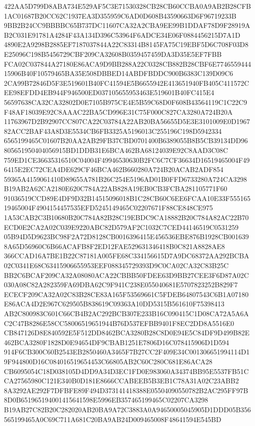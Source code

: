 \documentclass[UTF8,fontset=fandol,zihao=-4,a4paper]{ctexart}
\begin{document}
{{422AA5D799D8ABA734E529AF5C3E71530328CB28CB60CCBA0A9AB2B28CFB1AC01687B20CC62C1937EA3D355959C6AD0D608B43590663D6F96719233B
9BB2B24CC9BBBBC65B737DC11607CA32A2CBA9EE99B1DDAF78D9F28919AB2C031E91781A4284F43A134D396C53964F6ADCE34E06F0884456215D7A1D
4890E2A9298B2885EF7187037844A22C83314B8145FA75C19EBF5D6C708F03D8E25096C198B5456729CBF209CA32608B0359457459DA3D35E5EF7FBB
FCA02C037844A27180E86ACA9D9BB288A22C0328CB882B28CBF6E774655944415906B40F10579465BA35E508DBBED14ABDFBDDC900B6383C139D09C6
2CA99B72846D5F3E519601B40FC41594E5B6655942E413651940FB405C411572CEE98EFDD4EB944F946500ED037105655953463E519601B40FC415E4
56597638CA32CA32802D0E7105B975CE4E5B59C68D0F608B43564119C1C22C9F48AF18039E92C8AAAC22BA5CD996E31C75F000C827CA3280A724B20A
11763967D2B92907CC807CA22C03784A22AB20BA56655D5E3E3101009E0D196782ACC2BAF43A8D3E5534CB6FB3325A5196013C255196C198D5942334
6565199465C01607B20AA2AB29FB37CBD0701400B6389055B8B5CB39134DD96805651950404056915BD1DDB31E6BCA462BA68124039E92C8AAD3C08C
759ED1CE36635316510C04004F49946530630B2FC6C7CF36634D16519465004F496415E2EC72CEA4DE629CF46BCA462B660280A724B20ACAB2ADF854
59365A4159061410D89655A781B26C254E5196AD01B0FFD6733280A724CA3298B19AB2A62CA2180E620C784A22AB828A19EB0CB3FCBA281105771F60
91036519CCD89E4DF9D32B14515096018B1C28CB60C6EE6FCAA10E33F55516519465004F4904154457535EFD5245149465C02207671F88CE848CE975
1A53CAB2C3B10680B20C784A82B28C19EBDC9CA18882B20C784A82AC22B70ECD0E2CA2A02C039E9220ABC82D579AF2C1032C7CED44146519C0531259
05B94D5D9623BC98F2A72D8128CB0016396415E456536EBE876B1928CB0016398A65D56960C6B66ACAFB8F2ED12FAE529631346418B0C821A8828AE8
366CCAD16A7BE1B22C87181A005FE68C334156615D7A9DC68372AA292BCBA02C0341E68C63415906655953EEF088345729393D9C0CA02CA32C83B25C
BB2C6BCAF209CA32A08080ACA22CBBB50FDEE63D9BB27CEE3F6D87A02C030A08C82A282359FA69DBA62C9F941C238E055040681E5707823252B829F7
ECECF209CA32A02C83B28CE83A165F53569661C5FDEB64807543C6B1A07180E86ACA4D2E967C629505B838619C09363A10DD5315B561610F75398413
AB2C800983C601C66CB4B2AC292BCB307E233B16C090415C1D08CA72A5A6AC2C47B8286E58CC58006519651944B76D537EFBB9401F8EC2DD8A5516E0
CB847126D8E840592E5F512DD8462BCA3280B28C8D0E94E5C84DF9D499B82E462BCA3280F1828D0E94654DF9CBAB1251E7806D16C078415906D1D594
914F6CB300C60B2543EB2850460A3465F7B27CC2F409E34C001306651994114D19F944800D16C084016519654453C66805AB2C60C280C681E86ACA28
CB6095054C18D038105D4DD9A34D3EC1FD0E983060A34374BB95E5537FB51CCA27565980C121E340B0D181E8666CCABEEB5B3EB1C78A31A02C23ABB2
8A3292AE292F7DFBFE89F494D373141418388E05504090550782B2AC295FF97B8D0B651965194001415641598E5996EB357465199465C02207CA3298
B19AB27C82B20C282020AB20BA9A72C3883A0A94650005045905D1DDD05B356565199465A0C69C711A681C20BA9AB24D009465008F48641594E545BD
}}
\end{document}
